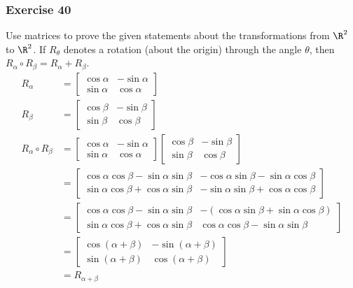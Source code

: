 \documentclass[letterpaper, 12pt]{math}
\begin{document}
\subsubsection*{Exercise 40}
Use matrices to prove the given statements about the transformations from
\( \R^2 \) to \( \R^2 \). If \( R_{\theta} \) denotes a rotation (about the
origin) through the angle \( \theta \), then \( R_{\alpha}\circ R_{\beta} =
R_{\alpha}+R_{\beta} \).
\begin{align*}
  R_{\alpha} &= \begin{bmatrix}
    \cos\alpha & -\sin\alpha \\
    \sin\alpha & \cos\alpha
  \end{bmatrix} \\
  R_{\beta} &= \begin{bmatrix}
    \cos\beta & -\sin\beta \\
    \sin\beta & \cos\beta
  \end{bmatrix} \\
  R_{\alpha}\circ R_{\beta} &= \begin{bmatrix}
    \cos\alpha & -\sin\alpha \\
    \sin\alpha & \cos\alpha
  \end{bmatrix}\begin{bmatrix}
    \cos\beta & -\sin\beta \\
    \sin\beta & \cos\beta
  \end{bmatrix} \\
  &= \begin{bmatrix}
    \cos\alpha\cos\beta-\sin\alpha\sin\beta &
      -\cos\alpha\sin\beta-\sin\alpha\cos\beta \\
    \sin\alpha\cos\beta+\cos\alpha\sin\beta &
      -\sin\alpha\sin\beta+\cos\alpha\cos\beta
  \end{bmatrix} \\
  &= \begin{bmatrix}
    \cos\alpha\cos\beta-\sin\alpha\sin\beta &
      -(\cos\alpha\sin\beta+\sin\alpha\cos\beta) \\
    \sin\alpha\cos\beta+\cos\alpha\sin\beta &
      \cos\alpha\cos\beta-\sin\alpha\sin\beta
  \end{bmatrix} \\
  &= \begin{bmatrix}
    \cos(\alpha+\beta) & -\sin(\alpha+\beta) \\
    \sin(\alpha+\beta) & \cos(\alpha+\beta)
  \end{bmatrix} \\
  &= R_{\alpha+\beta}
\end{align*}
\end{document}
